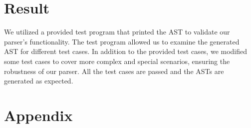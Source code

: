 \documentclass[12pt]{article}
\begin{document}
\section{Result}
We utilized a provided test program that printed the AST to validate our parser's functionality.
The test program allowed us to examine the generated AST for different test cases.
In addition to the provided test cases, we modified some test cases to cover more complex and special scenarios, ensuring the robustness of our parser.
All the test cases are passed and the ASTs are generated as expected. 




\appendix
{}
\section{Appendix}
\end{document}
